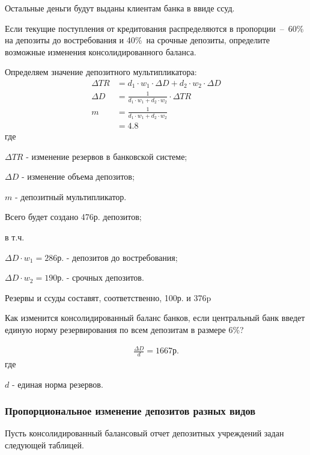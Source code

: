 \documentclass[12pt, table, a4paper,twoside]{exam}
\begin{document}
\begin{questions}
\begin{subparts}
\begin{solution}[12em]
		Остальные деньги будут выданы клиентам банка в ввиде ссуд.

	\end{solution}
	
	\subpart[10]  Если текущие поступления от кредитования распределяются в пропорции – 60\% на депозиты до востребования и 40\% на срочные депозиты, определите возможные изменения консолидированного баланса.
	
	\begin{solution}[12em]
		Определяем значение депозитного мультипликатора:
		\begin{align}
		\Delta TR&= d_1 \cdot w_1 \cdot \Delta D + d_2 \cdot w_2 \cdot \Delta D\nonumber\\
		\Delta D&=\frac{1}{d_1 \cdot w_1 +d_2 \cdot w_2}\cdot \Delta TR\nonumber\\
		m&= \frac{1}{d_1 \cdot w_1 +d_2 \cdot w_2}\\
		&= 4.8\nonumber
		\end{align}
		где
		
		$\Delta TR$ - изменение резервов в банковской системе;
		
		$\Delta D$ - изменение объема депозитов;
		
		$m$ - депозитный мультипликатор.
		
		Всего будет создано 476р. депозитов;
		
		в т.ч.
		
		$\Delta D \cdot w_1= 286\text{р.}$ - депозитов до востребования;

		$\Delta D \cdot w_2= 190\text{р.}$ - срочных депозитов.
		
		Резервы и ссуды составят, соответственно, 100р. и 376p
		
		
	\end{solution}

	\subpart[3] Как изменится консолидированный баланс банков, если центральный банк введет единую норму резервирования по всем депозитам в размере 6\%?
	\begin{solution}[12em]
		\begin{align*}
		\frac{\Delta D }{d}=1667\text{р.}
		\end{align*}
	где

	$d$ - единая норма резервов.

	\end{solution}

\end{subparts}
\addpoints

\subsubsection{Пропорциональное изменение депозитов разных видов}
\question[20] Пусть консолидированный балансовый отчет депозитных учреждений задан следующей таблицей.


\end{questions}
\end{document}
